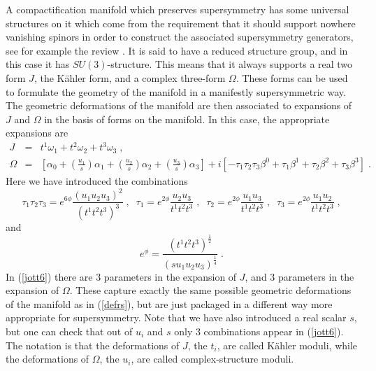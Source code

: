 \documentclass[11pt,a4paper]{article}
\numberwithin{equation}{section}
\numberwithin{table}{section}\setlength{\multlinegap}{25pt}
\newcommand{\bea}{\begin{eqnarray}}  \newcommand{\eea}{\end{eqnarray}}
\newcommand{\nn}{\nonumber}
\newcommand{\be}{\begin{equation}}
\newcommand{\ee}{\end{equation}}
\begin{document}
A compactification manifold which preserves supersymmetry has some universal structures on it which come from the requirement that it should support nowhere vanishing spinors in order to construct the associated supersymmetry generators, see for example the review \cite{Grana:2005jc}. It is said to have a reduced structure group, and in this case it has $SU(3)$-structure. This means that it always supports a real two form $J$, the K{\"a}hler form, and a complex three-form $\Omega$. These forms can be used to formulate the geometry of the manifold in a manifestly supersymmetric way. The geometric deformations of the manifold are then associated to expansions of $J$ and $\Omega$ in the basis of forms on the manifold. In this case, the appropriate expansions are
\bea
\label{jott6}
J &=& t^1 \omega_1 + t^2 \omega_2 + t^3 \omega_3 \;,  \\ \nn
\Omega &=& \left[\alpha_0 + \left(\frac{u_1}{s} \right) \alpha_1 + \left(\frac{u_2}{s} \right) \alpha_2+ \left(\frac{u_3}{s} \right) \alpha_3 \right] 
+ i\left[-\tau_1 \tau_2 \tau_3 \beta^0 + \tau_1 \beta^1+ \tau_2 \beta^2+ \tau_3 \beta^3  \right] \;.
\eea 
Here we have introduced the combinations
 \be
\tau_1 \tau_2 \tau_3 = e^{6 \phi} \frac{\left(u_1 u_2 u_3\right)^2}{\left(t^1 t^2 t^3 \right)^3} \;,\;\; \tau_1 = e^{2 \phi}\frac{u_2 u_3}{t^1 t^2 t^3} \;,\;\; \tau_2 = e^{2 \phi}\frac{u_1 u_3}{t^1 t^2 t^3} \;,\;\; \tau_3 = e^{2 \phi}\frac{u_1 u_2}{t^1 t^2 t^3} \;,
\ee
and
\be
e^{\phi} = \frac{\left(t^1 t^2 t^3\right)^{\frac12}}{\left(s u_1 u_2 u_3 \right)^{\frac14}} \;.
\ee
In (\ref{jott6}) there are 3 parameters in the expansion of $J$, and 3 parameters in the expansion of $\Omega$. These capture exactly the same possible geometric deformations of the manifold as in (\ref{defrs}), but are just packaged in a different way more appropriate for supersymmetry. Note that we have also introduced a real scalar $s$, but one can check that out of $u_i$ and $s$ only 3 combinations appear in (\ref{jott6}). The notation is that the deformations of $J$, the $t_i$, are called K{\"a}hler moduli, while the deformations of $\Omega$, the $u_i$, are called complex-structure moduli. 
\end{document}
